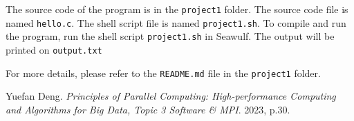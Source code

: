 \documentclass[12pt,a4paper]{article}
\begin{document}
The source code of the program is in the \texttt{project1} folder. The source code file is named \texttt{hello.c}. The shell script file is named \texttt{project1.sh}. To compile and run the program, run the shell script \texttt{project1.sh} in Seawulf. The output will be printed on \texttt{output.txt}

For more details, please refer to the \texttt{README.md} file in the \texttt{project1} folder.
\begin{thebibliography}{1}

    Yuefan Deng.
    \textit{Principles of Parallel Computing: High-performance Computing and Algorithms for Big Data, Topic 3 Software \& MPI}.
    2023, p.30.
    
\end{thebibliography}
\end{document}
